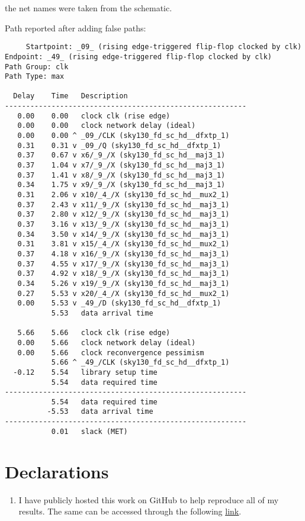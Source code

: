 \documentclass[12pt,a4paper]{article}
\begin{document}
\noindent the net names were taken from the schematic.

Path reported after adding false paths:

\begin{verbatim}
     Startpoint: _09_ (rising edge-triggered flip-flop clocked by clk)
Endpoint: _49_ (rising edge-triggered flip-flop clocked by clk)
Path Group: clk
Path Type: max

  Delay    Time   Description
---------------------------------------------------------
   0.00    0.00   clock clk (rise edge)
   0.00    0.00   clock network delay (ideal)
   0.00    0.00 ^ _09_/CLK (sky130_fd_sc_hd__dfxtp_1)
   0.31    0.31 v _09_/Q (sky130_fd_sc_hd__dfxtp_1)
   0.37    0.67 v x6/_9_/X (sky130_fd_sc_hd__maj3_1)
   0.37    1.04 v x7/_9_/X (sky130_fd_sc_hd__maj3_1)
   0.37    1.41 v x8/_9_/X (sky130_fd_sc_hd__maj3_1)
   0.34    1.75 v x9/_9_/X (sky130_fd_sc_hd__maj3_1)
   0.31    2.06 v x10/_4_/X (sky130_fd_sc_hd__mux2_1)
   0.37    2.43 v x11/_9_/X (sky130_fd_sc_hd__maj3_1)
   0.37    2.80 v x12/_9_/X (sky130_fd_sc_hd__maj3_1)
   0.37    3.16 v x13/_9_/X (sky130_fd_sc_hd__maj3_1)
   0.34    3.50 v x14/_9_/X (sky130_fd_sc_hd__maj3_1)
   0.31    3.81 v x15/_4_/X (sky130_fd_sc_hd__mux2_1)
   0.37    4.18 v x16/_9_/X (sky130_fd_sc_hd__maj3_1)
   0.37    4.55 v x17/_9_/X (sky130_fd_sc_hd__maj3_1)
   0.37    4.92 v x18/_9_/X (sky130_fd_sc_hd__maj3_1)
   0.34    5.26 v x19/_9_/X (sky130_fd_sc_hd__maj3_1)
   0.27    5.53 v x20/_4_/X (sky130_fd_sc_hd__mux2_1)
   0.00    5.53 v _49_/D (sky130_fd_sc_hd__dfxtp_1)
           5.53   data arrival time

   5.66    5.66   clock clk (rise edge)
   0.00    5.66   clock network delay (ideal)
   0.00    5.66   clock reconvergence pessimism
           5.66 ^ _49_/CLK (sky130_fd_sc_hd__dfxtp_1)
  -0.12    5.54   library setup time
           5.54   data required time
---------------------------------------------------------
           5.54   data required time
          -5.53   data arrival time
---------------------------------------------------------
           0.01   slack (MET)
\end{verbatim}

\section{Declarations}
\begin{enumerate}
    \item I have publicly hosted this work on GitHub to help reproduce all of my results. The same can be accessed through the following \href{https://github.com/iamkarthikbk/ee5311-2025}{\underline{link}}.
\end{enumerate}
\end{document}

